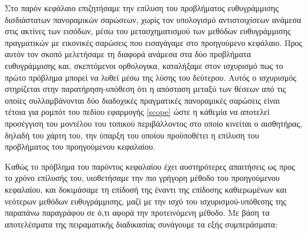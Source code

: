 Στο παρόν κεφάλαιο επιζητήσαμε την επίλυση του προβλήματος ευθυγράμμισης
δισδιάστατων πανοραμικών σαρώσεων, χωρίς τον υπολογισμό αντιστοιχίσεων ανάμεσα
στις ακτίνες των εισόδων, μέσω του μετασχηματισμού των μεθόδων ευθυγράμμισης
πραγματικών με εικονικές σαρώσεις που εισαγάγαμε στο προηγούμενο κεφάλαιο.
Προς αυτόν τον σκοπό μελετήσαμε τη διαφορά ανάμεσα στα δύο προβλήματα
ευθυγράμμισης και, σκεπτόμενοι ορθολογικα, καταλήξαμε στον ισχυρισμό πως το
πρώτο πρόβλημα μπορεί να λυθεί μέσω της λύσης του δεύτερου. Αυτός ο ισχυρισμός
στηρίζεται στην παρατήρηση-υπόθεση ότι η απόσταση μεταξύ των θέσεων από τις
οποίες συλλαμβάνονται δύο διαδοχικές πραγματικές πανοραμικές σαρώσεις είναι
τέτοια για ρομπότ του πεδίου εφαρμογής \ref{scope} ώστε η κάθεμία να αποτελεί
προσέγγιση του μοντέλου του τοπικού περιβάλλοντος στο οποίο κινείται ο
αισθητήρας, δηλαδή του χάρτη του, την ύπαρξη του οποίου προϋποθέτει η επίλυση
του προβλήματος του προηγούμενου κεφαλαίου.

Καθώς το πρόβλημα του παρόντος κεφαλαίου έχει αυστηρότερες απαιτήσεις ως προς
το χρόνο επίλυσής του, υιοθετήσαμε την πιο γρήγορη μέθοδο του προηγούμενου
κεφαλαίου, και δοκιμάσαμε τη επίδοσή της έναντι της επίδοσης καθιερωμένων και
νεότερων μεθόδων ευθυγράμμισης, μαζί με την ισχύ του ισχυρισμού-υπόθεσης της
παραπάνω παραγράφου σε ό,τι αφορά την προτεινόμενη μέθοδο. Με βάση τα
αποτελέσματα της πειραματικής διαδικασίας συνάγουμε τα εξής συμπεράσματα:


